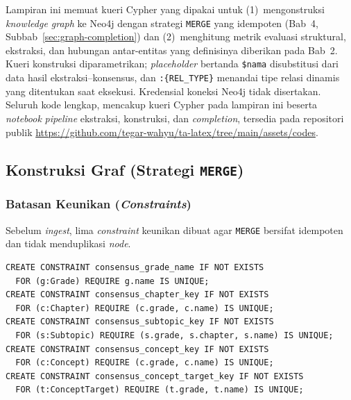 \documentclass[../../thesis]{subfiles}
\begin{document}
\ifSubfilesClassLoaded{}{\appendix\setcounter{chapter}{5}}

\label{lamp:cypher}

Lampiran ini memuat kueri Cypher yang dipakai untuk (1)~mengonstruksi
\textit{knowledge graph} ke Neo4j dengan strategi \texttt{MERGE} yang idempoten
(Bab~4, Subbab~\ref{sec:graph-completion}) dan (2)~menghitung metrik evaluasi
struktural, ekstraksi, dan hubungan antar-entitas yang definisinya diberikan
pada Bab~2. Kueri konstruksi diparametrikan; \textit{placeholder} bertanda
\texttt{\$nama} disubstitusi dari data hasil ekstraksi--konsensus, dan
\texttt{:\{REL\_TYPE\}} menandai tipe relasi dinamis yang ditentukan saat
eksekusi. Kredensial koneksi Neo4j tidak disertakan. Seluruh kode lengkap,
mencakup kueri Cypher pada lampiran ini beserta \textit{notebook} \textit{pipeline}
ekstraksi, konstruksi, dan \textit{completion}, tersedia pada repositori publik
\url{https://github.com/tegar-wahyu/ta-latex/tree/main/assets/codes}.

\subsection{Konstruksi Graf (Strategi \texttt{MERGE})}
\label{lamp:cypher-konstruksi}

\subsubsection{Batasan Keunikan (\textit{Constraints})}

Sebelum \textit{ingest}, lima \textit{constraint} keunikan dibuat agar
\texttt{MERGE} bersifat idempoten dan tidak menduplikasi \textit{node}.

\begin{lstlisting}[style=cypherbox,caption={Constraint keunikan node.},label={lst:cypher-constraint}]
CREATE CONSTRAINT consensus_grade_name IF NOT EXISTS
  FOR (g:Grade) REQUIRE g.name IS UNIQUE;
CREATE CONSTRAINT consensus_chapter_key IF NOT EXISTS
  FOR (c:Chapter) REQUIRE (c.grade, c.name) IS UNIQUE;
CREATE CONSTRAINT consensus_subtopic_key IF NOT EXISTS
  FOR (s:Subtopic) REQUIRE (s.grade, s.chapter, s.name) IS UNIQUE;
CREATE CONSTRAINT consensus_concept_key IF NOT EXISTS
  FOR (c:Concept) REQUIRE (c.grade, c.name) IS UNIQUE;
CREATE CONSTRAINT consensus_concept_target_key IF NOT EXISTS
  FOR (t:ConceptTarget) REQUIRE (t.grade, t.name) IS UNIQUE;
\end{lstlisting}
\end{document}
